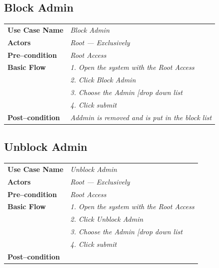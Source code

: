 \documentclass{article}
\begin{document}
\subsection{Block Admin}
    \begin{tabular}{ l | l }
    \toprule
      \rowcolor{LightCyan}
      \textbf{Use Case Name}    & \textit{Block Admin}\\
      \textbf{Actors}           & \textit{Root --- Exclusively}\\
      \rowcolor{LightCyan}
      \textbf{Pre--condition}   & \textit{Root Access}\\
      \textbf{Basic Flow}       & \textit{1. Open the system with the Root Access}\\
                                & \textit{2. Click Block Admin}\\
                                & \textit{3. Choose the Admin [drop down list}\\
                                & \textit{4. Click submit}\\
      \rowcolor{LightCyan}
      \textbf{Post--condition}  & \textit{Addmin is removed and is put in the block list}\\
    \toprule
    \end{tabular}



\subsection{Unblock Admin}
    \begin{tabular}{ l | l }
    \toprule
      \rowcolor{LightCyan}
      \textbf{Use Case Name}    & \textit{Unblock Admin}\\
      \textbf{Actors}           & \textit{Root --- Exclusively}\\
      \rowcolor{LightCyan}
      \textbf{Pre--condition}   & \textit{Root Access}\\
      \textbf{Basic Flow}       & \textit{1. Open the system with the Root Access}\\
                                & \textit{2. Click Unblock Admin}\\
                                & \textit{3. Choose the Admin [drop down list}\\
                                & \textit{4. Click submit}\\
      \rowcolor{LightCyan}
      \textbf{Post--condition}  & \textit{}\\
    \toprule
    \end{tabular}
\end{document}
